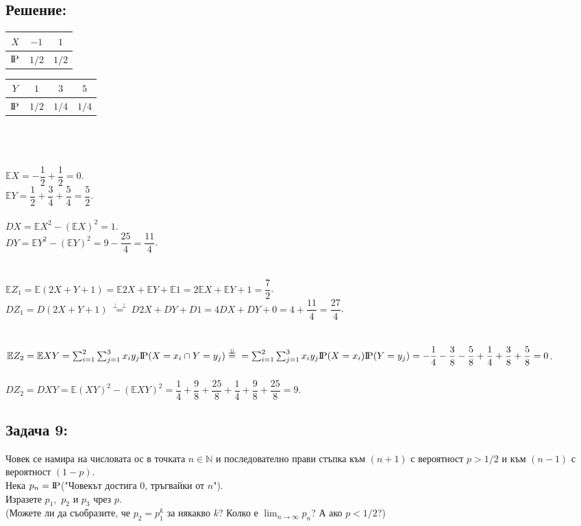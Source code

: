 \documentclass[french]{article}
\newcommand{\probP}{\text{I\kern-0.15em P}}
\begin{document}
	\subsection*{Решение:}
	\begin{tabular}{||c c c||} 
		\hline
		$X$ & $-1$ & $1$ \\ [0.5ex] 
		\hline\hline
		$\probP$ & $1/2$ & $1/2$ \\ 
		\hline
	\end{tabular}
	\begin{tabular}{||c c c c||} 
	\hline
	$Y$ & $1$ & $3$ & $5$ \\ [0.5ex] 
	\hline\hline
	$\probP$ & $1/2$ & $1/4$ & $1/4$ \\ 
	\hline
	\end{tabular}
	\\ \\ \\
	$\mathbb{E}X = -\dfrac{1}{2} + \dfrac{1}{2} = 0$. \\
	$\mathbb{E}Y = \dfrac{1}{2} + \dfrac{3}{4} + \dfrac{5}{4} = \dfrac{5}{2}$. \\
	\\
	$DX =\mathbb{E}X^2 - (\mathbb{E}X)^2 = 1$. \\
	$DY =\mathbb{E}Y^2 - (\mathbb{E}Y)^2 = 9 - \dfrac{25}{4} = \dfrac{11}{4}$. \\
	\\ \\
	$\mathbb{E}Z_1 = \mathbb{E}(2X + Y + 1) = \mathbb{E}2X + \mathbb{E}Y + \mathbb{E}1 = 2\mathbb{E}X + \mathbb{E}Y + 1 = \dfrac{7}{2}$. \\
	$DZ_1 = D(2X + Y + 1) \overset{\mathrm{\text{$\perp \!\!\! \perp$}}}{=} D2X + DY + D1 = 4DX + DY + 0 = 4 + \dfrac{11}{4} = \dfrac{27}{4}$. \\
	\\ \\
	$\mathbb{E}Z_2 = \mathbb{E}XY = \sum_{i=1}^{2}\sum_{j=1}^{3}x_iy_j\probP(X = x_i \cap Y = y_j) \overset{\mathrm{\text{$\perp \!\!\! \perp$}}}{=} \\ = \sum_{i=1}^{2}\sum_{j=1}^{3}x_iy_j\probP(X = x_i)\probP(Y = y_j) = -\dfrac{1}{4} - \dfrac{3}{8} - \dfrac{5}{8} + \dfrac{1}{4} + \dfrac{3}{8} + \dfrac{5}{8} = 0$. \\ \\
	$DZ_2 = DXY = \mathbb{E}(XY)^2 - (\mathbb{E}XY)^2 = \dfrac{1}{4} + \dfrac{9}{8} + \dfrac{25}{8} + \dfrac{1}{4} + \dfrac{9}{8} + \dfrac{25}{8} = 9$. \\


	\subsection*{Задача 9:}
	Човек се намира на числовата ос в точката $n \in \mathbb{N}$ и последователно прави стъпка към $(n + 1)$ с	вероятност $p > 1/2$ и към $(n - 1)$ с вероятност $(1 - p)$. \\
	Нека $p_n = \probP$("Човекът достига $0$, тръгвайки от $n$"). \\
	Изразете $p_1,$ $p_2$ и $p_3$ чрез $p$. \\
	(Можете ли да съобразите, че $p_2 = p_1^k$ за някакво $k$? Колко е $\lim_{n\to\infty}p_n$? А ако $p < 1/2$?)
	
\end{document}
